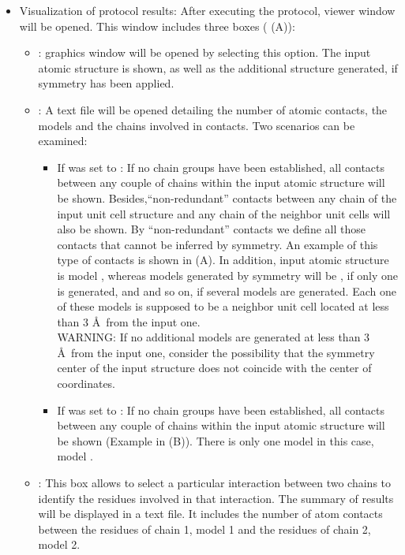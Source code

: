 \begin{itemize}
  \item Visualization of protocol results:
  After executing the protocol,  viewer window will be opened. This window includes three boxes ( (A)):
        \begin{itemize}
        \item {}: \chimera graphics window will be opened by selecting this option. The input atomic structure is shown, as well as the additional structure generated, if symmetry has been applied.
        \item {}: A text file will be opened detailing the number of atomic contacts, the models and the chains involved in contacts. Two scenarios can be examined:
            \begin{itemize}
            \item If  was set to : If no chain groups have been established, all contacts between any couple of chains within the input atomic structure will be shown. Besides,``non-redundant'' contacts between any chain of the input unit cell structure and any chain of the neighbor unit cells will also be shown. By ``non-redundant'' contacts we define all those contacts that cannot be inferred by symmetry. An example of this type of contacts is shown in  (A). In addition, input atomic structure is model , whereas models generated by symmetry will be , if only one is generated, and  and so on, if several models are generated. Each one of these models is supposed to be a neighbor unit cell located at less than 3 \AA\ from the input one.\\
            WARNING: If no additional models are generated at less than 3 \AA\ from the input one, consider the possibility that the symmetry center of the input structure does not coincide with the center of coordinates.
            \item If  was set to : If no chain groups have been established, all contacts between any couple of chains within the input atomic structure will be shown (Example in  (B)). There is only one model in this case, model .
            \end{itemize}
        \item {}: This box allows to select a particular interaction between two chains to identify the residues involved in that interaction. The summary of results will be displayed in a text file. It includes the number of atom contacts between the residues of chain 1, model 1 and the residues of chain 2, model 2.

\end{itemize}
\end{itemize}
